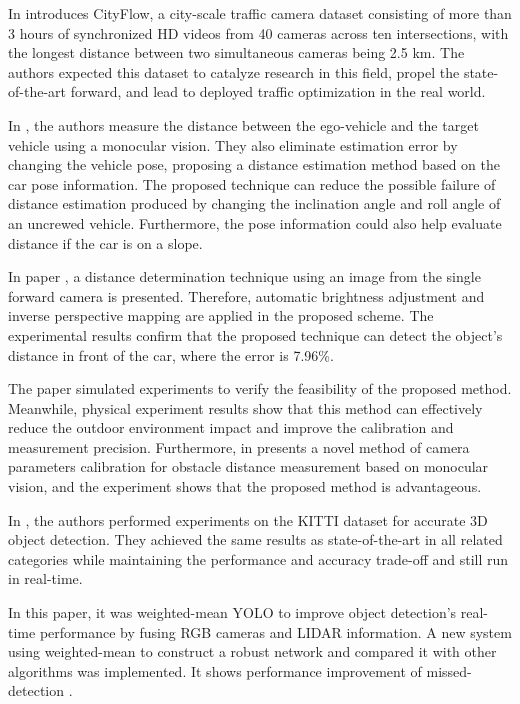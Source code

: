 In \cite{Tang2019} introduces CityFlow, a city-scale traffic camera dataset consisting of more than 3 hours of synchronized HD videos from 40 cameras across ten intersections, with the longest distance between two simultaneous cameras being 2.5 km. The authors expected this dataset to catalyze research in this field, propel the state-of-the-art forward, and lead to deployed traffic optimization in the real world.

In \cite{Qi2019}, the authors measure the distance between the ego-vehicle and the target vehicle using a monocular vision. They also eliminate estimation error by changing the vehicle pose, proposing a distance estimation method based on the car pose information. The proposed technique can reduce the possible failure of distance estimation produced by changing the inclination angle and roll angle of an uncrewed vehicle. Furthermore, the pose information could also help evaluate distance if the car is on a slope.

In paper \cite{Wongsaree2018}, a distance determination technique using an image from the single forward camera is presented. Therefore, automatic brightness adjustment and inverse perspective mapping are applied in the proposed scheme. The experimental results confirm that the proposed technique can detect the object's distance in front of the car, where the error is 7.96\%.

The paper \cite{Pan2019} simulated experiments to verify the feasibility of the proposed method. Meanwhile, physical experiment results show that this method can effectively reduce the outdoor environment impact and improve the calibration and measurement precision. Furthermore, in \cite{Lin2014} presents a novel method of camera parameters calibration for obstacle distance measurement based on monocular vision, and the experiment shows that the proposed method is advantageous.

In \cite{Simon2019a}, the authors performed experiments on the KITTI dataset for accurate 3D object detection. They achieved the same results as state-of-the-art in all related categories while maintaining the performance and accuracy trade-off and still run in real-time.

In this paper, it was weighted-mean YOLO to improve object detection's real-time performance by fusing RGB cameras and LIDAR information. A new system using weighted-mean to construct a robust network and compared it with other algorithms was implemented. It shows performance improvement of missed-detection \cite{Kim2019}.

